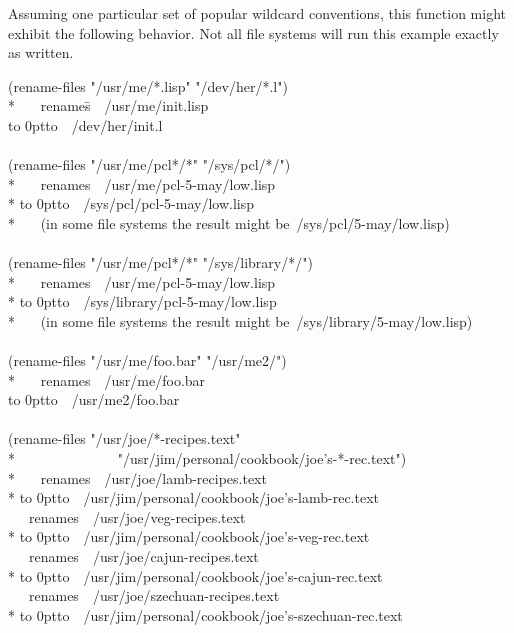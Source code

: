 \begin{newer}
Assuming one particular set of popular wildcard conventions,
this function might exhibit the following behavior.
Not all file systems will run this example exactly as written.
\begin{lisp}
(rename-files "/usr/me/*.lisp" "/dev/her/*.l") \\*
~~~\textrm{renames}\=~~/usr/me/init.lisp \\
\>\hbox to 0pt{\hss\rm to}~~/dev/her/init.l \\
\\
(rename-files "/usr/me/pcl*/*" "/sys/pcl/*/") \\*
~~~\textrm{renames}~~/usr/me/pcl-5-may/low.lisp \\*
\>\hbox to 0pt{\hss\rm to}~~/sys/pcl/pcl-5-may/low.lisp \\*
~~~\textrm{(in some file systems the result might be}~/sys/pcl/5-may/low.lisp\textrm{)} \\
\\
(rename-files "/usr/me/pcl*/*" "/sys/library/*/") \\*
~~~\textrm{renames}~~/usr/me/pcl-5-may/low.lisp \\*
\>\hbox to 0pt{\hss\rm to}~~/sys/library/pcl-5-may/low.lisp \\*
~~~\textrm{(in some file systems the result might be}~/sys/library/5-may/low.lisp\textrm{)} \\
\\
(rename-files "/usr/me/foo.bar" "/usr/me2/") \\*
~~~\textrm{renames}~~/usr/me/foo.bar \\
\>\hbox to 0pt{\hss\rm to}~~/usr/me2/foo.bar \\
\\
(rename-files "/usr/joe/*-recipes.text" \\*
~~~~~~~~~~~~~~"/usr/jim/personal/cookbook/joe's-*-rec.text") \\*
~~~\textrm{renames}~~/usr/joe/lamb-recipes.text \\*
\>\hbox to 0pt{\hss\rm to}~~/usr/jim/personal/cookbook/joe's-lamb-rec.text~~~~ \\
~~~\textrm{renames}~~/usr/joe/veg-recipes.text \\*
\>\hbox to 0pt{\hss\rm to}~~/usr/jim/personal/cookbook/joe's-veg-rec.text~~~~~ \\
~~~\textrm{renames}~~/usr/joe/cajun-recipes.text \\*
\>\hbox to 0pt{\hss\rm to}~~/usr/jim/personal/cookbook/joe's-cajun-rec.text~~~ \\
~~~\textrm{renames}~~/usr/joe/szechuan-recipes.text \\*
\>\hbox to 0pt{\hss\rm to}~~/usr/jim/personal/cookbook/joe's-szechuan-rec.text
\end{lisp}


\end{newer}
